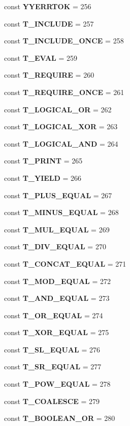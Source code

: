 \begin{DoxyCompactItemize}
\item 
const {\bf Y\+Y\+E\+R\+R\+T\+O\+K} = 256
\item 
const {\bf T\+\_\+\+I\+N\+C\+L\+U\+D\+E} = 257
\item 
const {\bf T\+\_\+\+I\+N\+C\+L\+U\+D\+E\+\_\+\+O\+N\+C\+E} = 258
\item 
const {\bf T\+\_\+\+E\+V\+A\+L} = 259
\item 
const {\bf T\+\_\+\+R\+E\+Q\+U\+I\+R\+E} = 260
\item 
const {\bf T\+\_\+\+R\+E\+Q\+U\+I\+R\+E\+\_\+\+O\+N\+C\+E} = 261
\item 
const {\bf T\+\_\+\+L\+O\+G\+I\+C\+A\+L\+\_\+\+O\+R} = 262
\item 
const {\bf T\+\_\+\+L\+O\+G\+I\+C\+A\+L\+\_\+\+X\+O\+R} = 263
\item 
const {\bf T\+\_\+\+L\+O\+G\+I\+C\+A\+L\+\_\+\+A\+N\+D} = 264
\item 
const {\bf T\+\_\+\+P\+R\+I\+N\+T} = 265
\item 
const {\bf T\+\_\+\+Y\+I\+E\+L\+D} = 266
\item 
const {\bf T\+\_\+\+P\+L\+U\+S\+\_\+\+E\+Q\+U\+A\+L} = 267
\item 
const {\bf T\+\_\+\+M\+I\+N\+U\+S\+\_\+\+E\+Q\+U\+A\+L} = 268
\item 
const {\bf T\+\_\+\+M\+U\+L\+\_\+\+E\+Q\+U\+A\+L} = 269
\item 
const {\bf T\+\_\+\+D\+I\+V\+\_\+\+E\+Q\+U\+A\+L} = 270
\item 
const {\bf T\+\_\+\+C\+O\+N\+C\+A\+T\+\_\+\+E\+Q\+U\+A\+L} = 271
\item 
const {\bf T\+\_\+\+M\+O\+D\+\_\+\+E\+Q\+U\+A\+L} = 272
\item 
const {\bf T\+\_\+\+A\+N\+D\+\_\+\+E\+Q\+U\+A\+L} = 273
\item 
const {\bf T\+\_\+\+O\+R\+\_\+\+E\+Q\+U\+A\+L} = 274
\item 
const {\bf T\+\_\+\+X\+O\+R\+\_\+\+E\+Q\+U\+A\+L} = 275
\item 
const {\bf T\+\_\+\+S\+L\+\_\+\+E\+Q\+U\+A\+L} = 276
\item 
const {\bf T\+\_\+\+S\+R\+\_\+\+E\+Q\+U\+A\+L} = 277
\item 
const {\bf T\+\_\+\+P\+O\+W\+\_\+\+E\+Q\+U\+A\+L} = 278
\item 
const {\bf T\+\_\+\+C\+O\+A\+L\+E\+S\+C\+E} = 279
\item 
const {\bf T\+\_\+\+B\+O\+O\+L\+E\+A\+N\+\_\+\+O\+R} = 280

\end{DoxyCompactItemize}
